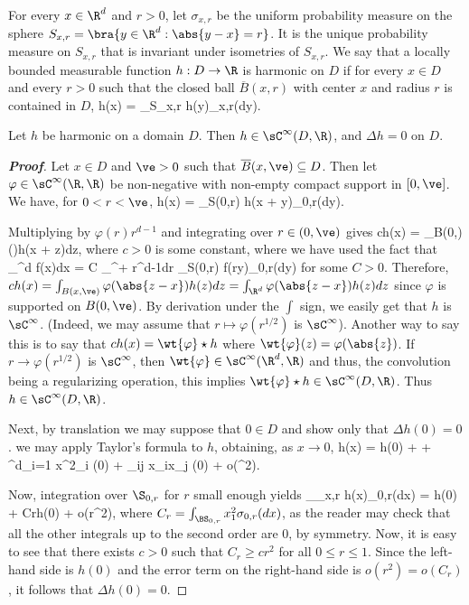 For every $x \in \R^d$ and $r > 0$, let $\sigma_{x,r}$ be the uniform probability measure on the sphere $S_{x,r} = \bra{y \in \R^d : \abs{y - x} = r}$. It is the unique probability measure on $S_{x,r}$ that is invariant under isometries of $S_{x,r}$. We say that a locally bounded measurable function $h: D \to \R$ is harmonic on $D$ if for every $x \in D$ and every $r > 0$ such that the closed ball $\overline{B}(x, r)$ with center $x$ and radius $r$ is contained in $D$,
\be
h(x) = \int_{S_{x,r}} h(y)\sigma_{x,r}(dy).
\ee

\begin{proposition}
Let $h$ be harmonic on a domain $D$. Then $h \in \sC^\infty(D,\R)$, and $\Delta h = 0$ on $D$.
\end{proposition}

\begin{proof}[\bf Proof]
Let $x \in D$ and $\ve > 0$ such that $\overline{B}(x, \ve) \subseteq D$. Then let $\varphi \in \sC^\infty(\R,\R)$ be non-negative with non-empty compact support in $[0, \ve]$. We have, for $0 < r < \ve$,
\be
h(x) = \int_{S(0,r)} h(x + y)\sigma_{0,r}(dy).
\ee

Multiplying by $\varphi(r)r^{d-1}$ and integrating over $r \in (0, \ve)$ gives
\be
ch(x) = \int_{B(0,\ve)} \varphi()h(x + z)dz,
\ee
where $c > 0$ is some constant, where we have used the fact that
\be
\int_{\R^d} f(x)dx = C \int_{\R^+} r^{d-1}dr \int_{S(0,r)} f(ry)\sigma_{0,r}(dy)
\ee
for some $C > 0$. Therefore, $ch(x) = \int_{B(x,\ve)} \varphi(\abs{z - x})h(z)dz = \int_{\R^d} \varphi(\abs{z - x})h(z)dz$ since $\varphi$ is supported on $B(0, \ve)$. By derivation under the $\int$ sign, we easily get that $h$ is $\sC^\infty$. (Indeed, we may assume that $r \mapsto \varphi(r^{1/2})$ is $\sC^\infty$). Another way to say this is to say that $ch(x) = \wt{\varphi}\star h$ where $\wt{\varphi}(z) = \varphi(\abs{z})$. If $r \to \varphi(r^{1/2})$ is $\sC^\infty$, then $\wt{\varphi} \in \sC^\infty(\R^d,\R)$ and thus, the convolution being a regularizing operation, this implies $\wt{\varphi} \star h \in \sC^\infty(D,\R)$. Thus $h \in \sC^\infty(D,\R)$.

Next, by translation we may suppose that $0 \in D$ and show only that $\Delta h(0) = 0$. we may apply Taylor's formula to $h$, obtaining, as $x \to 0$,
\be
h(x) = h(0) +  + \sum^d_{i=1} x^2_i  (0) + \sum_{i\neq j} x_ix_j  (0) + o(^2).
\ee

Now, integration over $\S_{0,r}$ for $r$ small enough yields
\be
\int_{\BS_{x,r}} h(x)\sigma_{0,r}(dx) = h(0) + Cr\Delta h(0) + o(r^2),
\ee
where $C_r = \int_{\BS_{0,r}} x^2_1 \sigma_{0,r}(dx)$, as the reader may check that all the other integrals up to the second order are 0, by symmetry. Now, it is easy to see that there exists $c > 0$ such that $C_r \geq cr^2$ for all $0 \leq r \leq 1$. Since the left-hand side is $h(0)$ and the error term on the right-hand side is $o(r^2) = o(C_r)$, it follows that $\Delta h(0) = 0$.
\end{proof}

